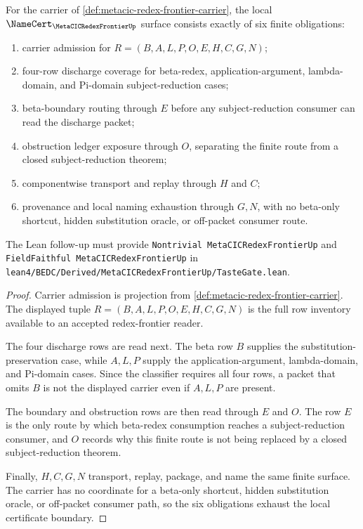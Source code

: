 \begin{theorem}
\label{thm:metacic-redex-frontier-namecert-obligations}
For the carrier of \autoref{def:metacic-redex-frontier-carrier}, the local
$\NameCert_{\MetaCICRedexFrontierUp}$ surface consists exactly of six finite
obligations:
\begin{enumerate}
\item carrier admission for $R=(B,A,L,P,O,E,H,C,G,N)$;
\item four-row discharge coverage for beta-redex, application-argument, lambda-domain, and Pi-domain subject-reduction cases;
\item beta-boundary routing through $E$ before any subject-reduction consumer can read the discharge packet;
\item obstruction ledger exposure through $O$, separating the finite route from a closed subject-reduction theorem;
\item componentwise transport and replay through $H$ and $C$;
\item provenance and local naming exhaustion through $G,N$, with no beta-only shortcut, hidden substitution oracle, or off-packet consumer route.
\end{enumerate}
The Lean follow-up must provide \texttt{Nontrivial MetaCICRedexFrontierUp} and
\texttt{FieldFaithful MetaCICRedexFrontierUp} in
\texttt{lean4/BEDC/Derived/MetaCICRedexFrontierUp/TasteGate.lean}.
\end{theorem}
\begin{proof}
Carrier admission is projection from
\autoref{def:metacic-redex-frontier-carrier}. The displayed tuple
$R=(B,A,L,P,O,E,H,C,G,N)$ is the full row inventory available to an accepted
redex-frontier reader.

The four discharge rows are read next. The beta row $B$ supplies the
substitution-preservation case, while $A,L,P$ supply the application-argument,
lambda-domain, and Pi-domain cases. Since the classifier requires all four
rows, a packet that omits $B$ is not the displayed carrier even if $A,L,P$ are
present.

The boundary and obstruction rows are then read through $E$ and $O$. The row
$E$ is the only route by which beta-redex consumption reaches a
subject-reduction consumer, and $O$ records why this finite route is not being
replaced by a closed subject-reduction theorem.

Finally, $H,C,G,N$ transport, replay, package, and name the same finite
surface. The carrier has no coordinate for a beta-only shortcut, hidden
substitution oracle, or off-packet consumer path, so the six obligations
exhaust the local certificate boundary.
\end{proof}

